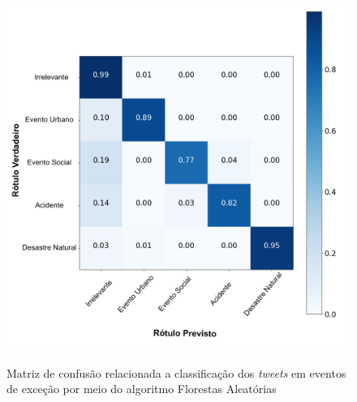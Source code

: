\documentclass[
	12pt,				%
	oneside,			%
	a4paper,			%
	english,			%
	brazil				%
	]{abntex2ppgsi}
\begin{document}
{{{\begin{apendicesenv}
\begin{figure}[!htb]
	\centering
 	  \caption{Matriz de confusão relacionada a classificação dos \textit{tweets} em eventos de exceção por meio do algoritmo Florestas Aleatórias}
		\includegraphics[width=1\linewidth]{images/confusion_matrix_rf_pt.png}
	\label{fig:confusion_matrix_rf}
\end{figure}


\end{apendicesenv}}}}
\end{document}
